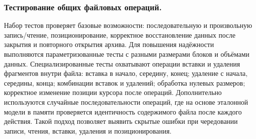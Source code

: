\subsubsection{Тестирование общих файловых операций.}
Набор тестов проверяет базовые возможности: последовательную и произвольную запись/чтение, позиционирование, корректное восстановление данных после закрытия и повторного открытия архива. Для повышения надёжности выполняются параметризованные тесты с разными размерами блоков и объёмами данных. Специализированные тесты охватывают операции вставки и удаления фрагментов внутри файла: вставка в начало, середину, конец; удаление с начала, середины, конца; комбинации вставок и удалений; обработка нулевых размеров; корректное изменение позиции курсора после операций. Дополнительно используются случайные последовательности операций, где на основе эталонной модели в памяти проверяется идентичность содержимого файла после каждого действия. Такой подход позволяет выявить скрытые ошибки при чередовании записи, чтения, вставки, удаления и позиционирования.